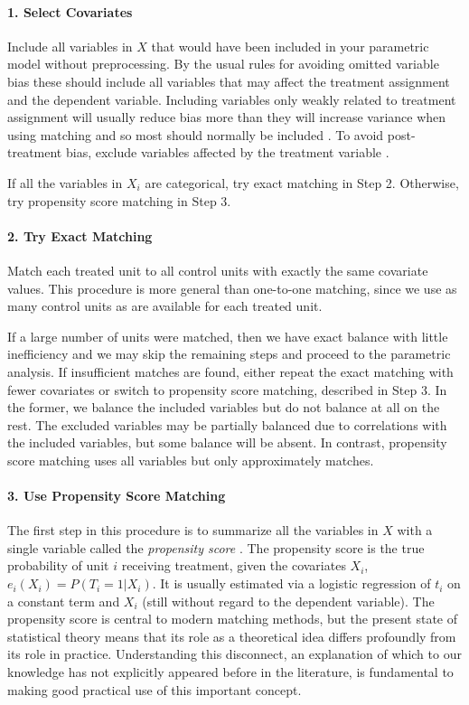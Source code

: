 \documentclass[11pt,titlepage]{article}
\begin{document}
\paragraph{1. Select Covariates}  
Include all variables in $X$ that would have been included in your
parametric model without preprocessing.  By the usual rules for
avoiding omitted variable bias these should include all variables that
may affect the treatment assignment and the dependent variable.
Including variables only weakly related to treatment assignment will
usually reduce bias more than they will increase variance when using
matching and so most should normally be included \citep{RubTho96,
  HecIchSmi98}.  To avoid post-treatment bias, exclude variables
affected by the treatment variable
\citep{FraRub02,Greenland03,KinZen04}.

If all the variables in $X_i$ are categorical, try exact matching in
Step 2.  Otherwise, try propensity score matching in Step 3.
\paragraph{2. Try Exact Matching}  
Match each treated unit to all control units with exactly the same
covariate values.  This procedure is more general than one-to-one
matching, since we use as many control units as are available for each
treated unit.

If a large number of units were matched, then we have exact balance
with little inefficiency and we may skip the remaining steps and
proceed to the parametric analysis.  If insufficient matches are
found, either repeat the exact matching with fewer covariates or
switch to propensity score matching, described in Step 3.  In the
former, we balance the included variables but do not balance at all on
the rest.  The excluded variables may be partially balanced due to
correlations with the included variables, but some balance will be
absent.  In contrast, propensity score matching uses all variables
but only approximately matches.

\paragraph{3. Use Propensity Score Matching}  
The first step in this procedure is to summarize all the variables in
$X$ with a single variable called the \emph{propensity score}
\citep{RosRub83}.  The propensity score is the true probability of
unit $i$ receiving treatment, given the covariates $X_i$, $e_i(X_i) =
P(T_i=1 | X_i)$.  It is usually estimated via a logistic regression of
$t_i$ on a constant term and $X_i$ (still without regard to the
dependent variable).  The propensity score is central to modern
matching methods, but the present state of statistical theory means
that its role as a theoretical idea differs profoundly from its role
in practice.  Understanding this disconnect, an explanation of which
to our knowledge has not explicitly appeared before in the literature,
is fundamental to making good practical use of this important concept.
\end{document}
